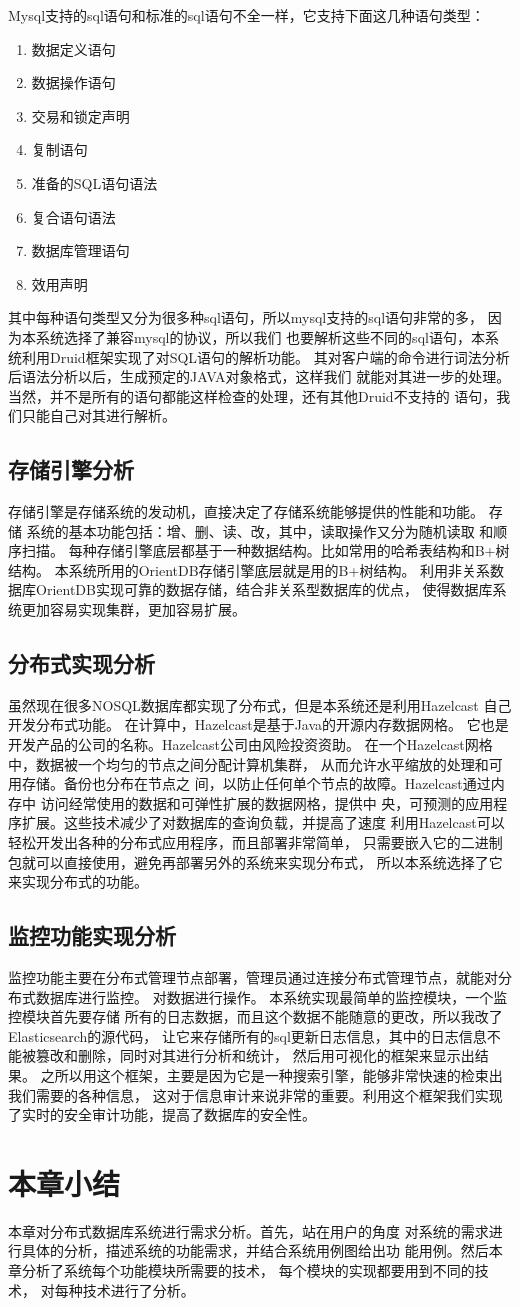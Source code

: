 Mysql支持的sql语句和标准的sql语句不全一样，它支持下面这几种语句类型：
\begin{enumerate}
\item 数据定义语句     
\item 数据操作语句     
\item 交易和锁定声明     
\item 复制语句     
\item 准备的SQL语句语法     
\item 复合语句语法     
\item 数据库管理语句     
\item 效用声明  
\end{enumerate}   
其中每种语句类型又分为很多种sql语句，所以mysql支持的sql语句非常的多，
因为本系统选择了兼容mysql的协议，所以我们
也要解析这些不同的sql语句，本系统利用Druid框架实现了对SQL语句的解析功能。
其对客户端的命令进行词法分析后语法分析以后，生成预定的JAVA对象格式，这样我们
就能对其进一步的处理。当然，并不是所有的语句都能这样检查的处理，还有其他Druid不支持的
语句，我们只能自己对其进行解析。
\subsection{存储引擎分析}
存储引擎是存储系统的发动机，直接决定了存储系统能够提供的性能和功能。
存储
系统的基本功能包括：增、删、读、改，其中，读取操作又分为随机读取
和顺序扫描。
每种存储引擎底层都基于一种数据结构。比如常用的哈希表结构和B+树结构。
本系统所用的OrientDB存储引擎底层就是用的B+树结构。
利用非关系数据库OrientDB实现可靠的数据存储，结合非关系型数据库的优点，
使得数据库系统更加容易实现集群，更加容易扩展。
\subsection{分布式实现分析}
虽然现在很多NOSQL数据库都实现了分布式，但是本系统还是利用Hazelcast
自己开发分布式功能。
在计算中，Hazelcast是基于Java的开源内存数据网格。
它也是开发产品的公司的名称。Hazelcast公司由风险投资资助。
在一个Hazelcast网格中，数据被一个均匀的节点之间分配计算机集群，
从而允许水平缩放的处理和可用存储。备份也分布在节点之
间，以防止任何单个节点的故障。Hazelcast通过内存中
访问经常使用的数据和可弹性扩展的数据网格，提供中
央，可预测的应用程序扩展。这些技术减少了对数据库的查询负载，并提高了速度
利用Hazelcast可以轻松开发出各种的分布式应用程序，而且部署非常简单，
只需要嵌入它的二进制包就可以直接使用，避免再部署另外的系统来实现分布式，
所以本系统选择了它来实现分布式的功能。
\subsection{监控功能实现分析}
监控功能主要在分布式管理节点部署，管理员通过连接分布式管理节点，就能对分布式数据库进行监控。
对数据进行操作。
本系统实现最简单的监控模块，一个监控模块首先要存储
所有的日志数据，而且这个数据不能随意的更改，所以我改了Elasticsearch的源代码，
让它来存储所有的sql更新日志信息，其中的日志信息不能被篡改和删除，同时对其进行分析和统计，
然后用可视化的框架来显示出结果。
之所以用这个框架，主要是因为它是一种搜索引擎，能够非常快速的检束出我们需要的各种信息，
这对于信息审计来说非常的重要。利用这个框架我们实现了实时的安全审计功能，提高了数据库的安全性。
\section{本章小结}
本章对分布式数据库系统进行需求分析。首先，站在用户的角度
对系统的需求进行具体的分析，描述系统的功能需求，并结合系统用例图给出功
能用例。然后本章分析了系统每个功能模块所需要的技术，
每个模块的实现都要用到不同的技术，
对每种技术进行了分析。